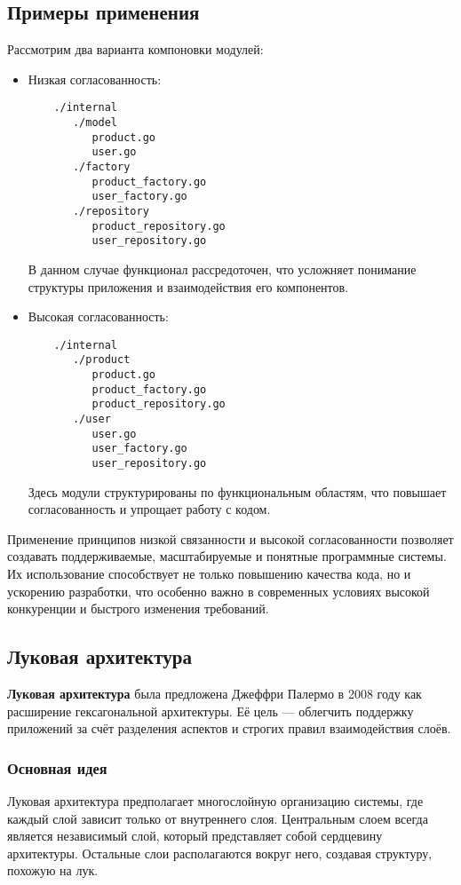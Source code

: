 \subsection*{Примеры применения}

Рассмотрим два варианта компоновки модулей:

\begin{itemize}
    \item Низкая согласованность:
    \begin{verbatim}
    ./internal
       ./model
          product.go
          user.go
       ./factory
          product_factory.go
          user_factory.go
       ./repository
          product_repository.go
          user_repository.go
    \end{verbatim}
    В данном случае функционал рассредоточен, что усложняет понимание структуры приложения и взаимодействия его компонентов.
    
    \item Высокая согласованность:
    \begin{verbatim}
    ./internal
       ./product
          product.go
          product_factory.go
          product_repository.go
       ./user
          user.go
          user_factory.go
          user_repository.go
    \end{verbatim}
    Здесь модули структурированы по функциональным областям, что повышает согласованность и упрощает работу с кодом.
\end{itemize}


Применение принципов низкой связанности и высокой согласованности позволяет создавать поддерживаемые, масштабируемые и понятные программные системы. Их использование способствует не только повышению качества кода, но и ускорению разработки, что особенно важно в современных условиях высокой конкуренции и быстрого изменения требований.





\subsection{Луковая архитектура}
\textbf{Луковая архитектура} была предложена Джеффри Палермо в 2008 году как расширение гексагональной архитектуры. Её цель — облегчить поддержку приложений за счёт разделения аспектов и строгих правил взаимодействия слоёв.

\subsubsection{Основная идея}
Луковая архитектура предполагает многослойную организацию системы, где каждый слой зависит только от внутреннего слоя. Центральным слоем всегда является независимый слой, который представляет собой сердцевину архитектуры. Остальные слои располагаются вокруг него, создавая структуру, похожую на лук.

